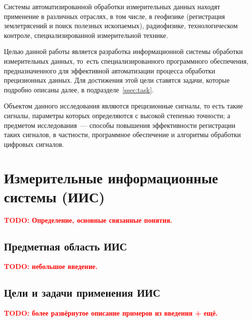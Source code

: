 \documentclass[a4paper, 14pt, titlepage]{extarticle}
\newcommand{\todo}[1]{\textbf{\textcolor{red}{TODO: #1}}}
\let\oldsection\section
\renewcommand{\section}{\newpage\oldsection}
\begin{document}
  Системы автоматизированной обработки измерительных данных находят применение в различных отраслях,
  в том числе, в геофизике (регистрация землетрясений и поиск полезных ископаемых), радиофизике,
  технологическом контроле, специализированной измерительной технике.

  Целью данной работы является разработка информационной системы обработки измерительных данных,
  то~есть специализированного программного обеспечения, предназначенного для эффективной
  автоматизации процесса обработки прецизионных данных. Для достижения этой цели ставятся задачи,
  которые подробно описаны далее, в подразделе~\ref{ssec:task}.

  Объектом данного исследования являются прецизионные сигналы, то есть такие сигналы, параметры
  которых определяются с высокой степенью точности; а предметом исследования~---
  способы повышения эффективности регистрации таких сигналов, в частности, программное обеспечение и
  алгоритмы обработки цифровых сигналов.

  \section{Измерительные информационные системы (ИИС)}

  \todo{Определение, основные связанные понятия.}

  \subsection{Предметная область ИИС}

  \todo{небольшое введение.}

  \subsection{Цели и задачи применения ИИС}

  \todo{более развёрнутое описание примеров из введения + ещё.}

\end{document}
